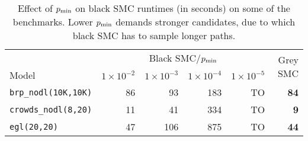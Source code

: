 \begin{table}[t]
	\centering
	\caption{Effect of $p_{\min}$ on black SMC runtimes (in seconds) on some of the benchmarks. Lower $p_{\min}$ demands stronger candidates, due to which black SMC has to sample longer paths.}
	\label{tab:fsmc-vary-pmin}
	\setlength{\tabcolsep}{10pt} %
	\begin{tabular}{@{}lrrrrr@{}}
		\toprule
		                                           &                             \multicolumn{4}{c}{Black SMC/$p_{\min}$}  & \multirow{2}{*}{Grey SMC}                           \\
		\cmidrule(l){2-5}
		Model & $1 \times 10^{-2}$ & $1 \times 10^{-3}$ & $1 \times 10^{-4}$ & $1 \times 10^{-5}$ &  \\ \midrule
		\texttt{brp\_nodl(10K,10K)}         & 86                & 93                 & 183                & TO    & \textbf{84}             \\
		\texttt{crowds\_nodl(8,20)}         & 11                 & 41                 & 334                & TO     & \textbf{9}            \\
		\texttt{egl(20,20)}                 & 47                 & 106                 & 875                & TO     & \textbf{44}            \\ \bottomrule
	\end{tabular}
\end{table}

